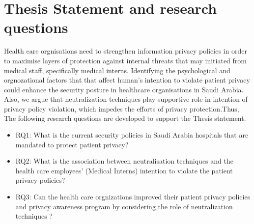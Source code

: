 \section{Thesis Statement and research questions}
Health care orgnisations need to strengthen information privacy policies in order to maximise layers of protection against internal threats that may initiated from medical staff, specifically medical interns. Identifying the psychological and orgnozational factors that that affect human's intention to violate patient privacy could enhance the security posture in healthcare organisations in Saudi Arabia. Also, we argue that neutralization techniques play supportive role in intention of privacy policy violation, which impedes the efforts of  privacy protection.Thus, The following research questions are developed to support the Thesis statement.
\begin{itemize} 
\item RQ1: What is the current security policies in Saudi Arabia hospitals that are mandated to protect patient privacy?
\item RQ2: What is the association between neutralisation techniques and the health care employees' (Medical Interns) intention to violate the patient privacy policies?
\item RQ3: Can the health care orgnizations improved their patient privacy policies and privacy awareness program by considering the role of neutralization techniques ?	
\end{itemize}

